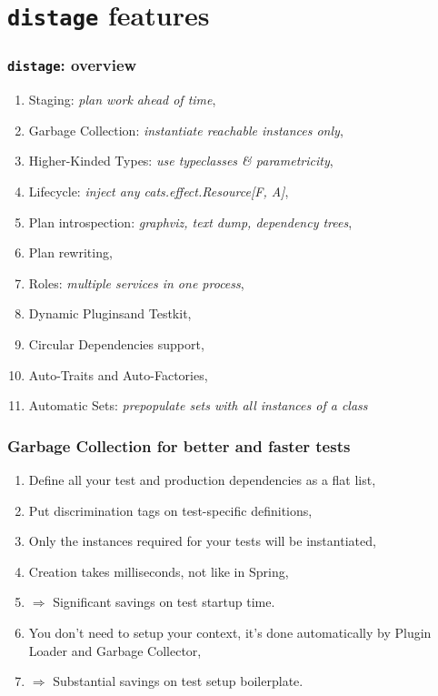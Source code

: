 \documentclass[usenames,dvipsnames]{beamer}
\newcommand{\distage}{\texttt{distage}\xspace}
\begin{document}
\section{\distage{} features}
\begin{frame}
  \frametitle{\distage: overview}
  \begin{enumerate}
    \item Staging: \textit{plan work ahead of time},
    \item Garbage Collection: \textit{instantiate reachable instances only},
    \item Higher-Kinded Types: \textit{use typeclasses \& parametricity},
    \item Lifecycle: \textit{inject any cats.effect.Resource[F, A]},
    \item Plan introspection: \textit{graphviz, text dump, dependency trees},
    \item Plan rewriting,
    \item Roles: \textit{multiple services in one process},
    \item Dynamic Plugins\footnotemark[1] and Testkit,
    \item Circular Dependencies support,
    \item Auto-Traits and Auto-Factories\footnotemark[2],
    \item Automatic Sets: \textit{prepopulate sets with all instances of a class}
  \end{enumerate}
\end{frame}

\begin{frame}
\frametitle{Garbage Collection for better and faster tests}
  \begin{enumerate}
    \item Define all your test and production dependencies as a flat list,
    \item Put discrimination tags on test-specific definitions,
    \item Only the instances required for your tests will be instantiated,
    \item Creation takes milliseconds, not like in Spring,
    \item $\Rightarrow$ Significant savings on test startup time.
    \item You don't need to setup your context, it's done automatically by Plugin Loader and Garbage Collector,
    \item $\Rightarrow$ Substantial savings on test setup boilerplate.
  \end{enumerate}
\end{frame}
\end{document}
